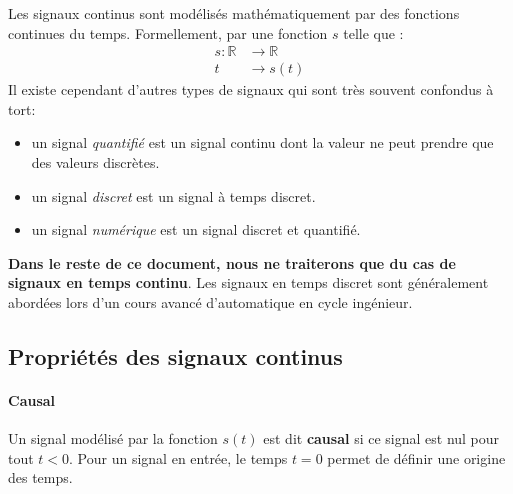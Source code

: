 Les signaux continus sont modélisés mathématiquement par des fonctions 
continues du temps. Formellement, par une fonction $s$ telle que :
\begin{align*}
s : \mathbb{R}&\rightarrow\mathbb{R} \\  
t&\rightarrow s(t) 
\end{align*}    
Il existe cependant d'autres types de signaux qui sont très souvent confondus 
à tort:
\begin{itemize}
    \item un signal \emph{quantifié} est un signal continu 
          dont la valeur ne peut prendre que des valeurs discrètes. 
    \item un signal \emph{discret} est un signal à temps discret.
    \item un signal \emph{numérique} est un signal discret et quantifié.   
\end{itemize}
\textbf{Dans le reste de ce document, nous ne traiterons que
du cas de signaux en temps continu}. Les signaux en temps discret
sont généralement abordées lors d'un cours 
avancé d'automatique en cycle ingénieur.
\subsection{Propriétés des signaux continus}
\paragraph{Causal}
Un signal modélisé par la fonction $s(t)$ est dit \textbf{causal}
si ce signal est nul pour tout $t<0$. Pour un signal en entrée, le temps 
$t=0$ permet de définir une origine des temps.
\begin{figure}[!h]
    \centering
    
\end{figure}

